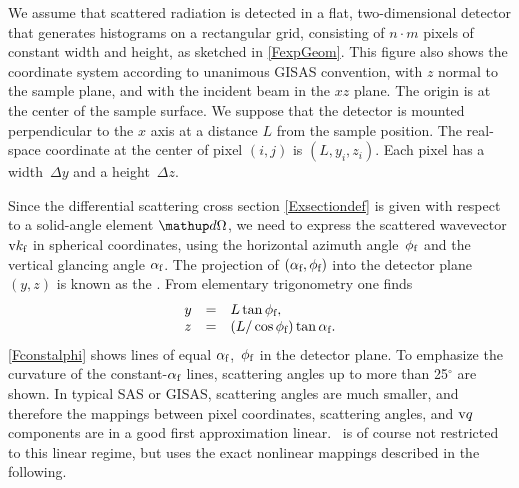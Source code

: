 We assume that scattered radiation is detected in a flat,
two-dimensional detector
that generates histograms on a rectangular grid,
consisting of $n\cdot m$ pixels of constant width and height,
as sketched in \cref{FexpGeom}.
This figure also shows the coordinate system
%
%
according to unanimous GISAS convention,
with $z$ normal to the sample plane,
and with the incident beam in the $xz$ plane.
The origin is at the center of the sample surface.
We suppose that the detector is mounted perpendicular to the $x$ axis
at a distance $L$ from the sample position.
The real-space coordinate at the center of pixel $(i,j)$ is $(L,y_i,z_i)$.
Each pixel has a width~$\Delta y$ and a height~$\Delta z$.
%
%

Since the differential scattering cross section \cref{Exsectiondef}
is given with respect to a solid-angle element $\d\Omega$,
we need to express the scattered wavevector $\text{v}{k}_{\text{f}}$ in spherical coordinates,
using the horizontal azimuth angle~$\phi_{\text{f}}$
and the vertical glancing angle $\alpha_{\text{f}}$.
The projection of $(\alpha_{\text{f}},\phi_{\text{f}})$ into
the detector plane~$(y,z)$ is known as the .
%
%
%
%
From elementary trigonometry one finds
\begin{equation}\label{Eyzdet}
  \begin{array}{lcl}
  y &=& L \tan\phi_{\text{f}},\\
  z &=& (L/ \cos\phi_{\text{f}}) \tan\alpha_{\text{f}}.
  \end{array}
\end{equation}
\cref{Fconstalphi} shows lines of equal $\alpha_{\text{f}}$,~$\phi_{\text{f}}$
in the detector plane.
To emphasize the curvature of the constant-$\alpha_{\text{f}}$ lines,
scattering angles up to more than 25$^\circ$ are shown.
In typical SAS or GISAS,
scattering angles are much smaller,
and therefore the mappings between pixel coordinates,
scattering angles, and $\text{v}{q}$ components are in a good first approximation linear.
\BornAgain\ is of course not restricted to this linear regime,
but uses the exact nonlinear mappings described in the following.


